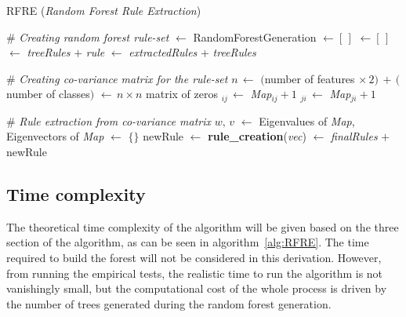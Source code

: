 \documentclass[10pt]{article}
\begin{document}
\begin{algorithm}[!ht]
\caption{RFRE (\textit{Random Forest Rule Extraction})}\label{alg:RFRE}
\begin{algorithmic}[1]
\State \# {\sl Creating random forest rule-set}
 $\gets$ RandomForestGeneration		
 $\gets [\, ]$
	  $\gets [\,]$
		 $\gets$ {\sl treeRules} $+$ {\sl rule} 
	\EndFor
	 $\gets$ {\sl extractedRules} + {\sl treeRules}
\EndFor

\State \# {\sl Creating co-variance matrix for the rule-set}
\State $n \, \gets$ $($number of features $\times \, 2) \, + \,($number of classes$)$ 
 $\gets \, n\times n$ matrix of zeros
		$_{ij} \, \gets$  {\sl Map}$_{ij} + 1$
		$_{ji} \, \gets$  {\sl Map}$_{ji} + 1$
	\EndIf
\EndFor

\State \# {\sl Rule extraction from co-variance matrix}
\State $w, \, v$ $\gets$ Eigenvalues of {\sl Map}, Eigenvectors of {\sl Map }
 $\gets$ $\{\}$
	\State newRule $\gets $ \textbf{rule\_creation}({\sl  vec})
	 $\gets$ {\sl finalRules} $+$ newRule
	\EndIf
\EndFor
\State {}
\end{algorithmic}
\end{algorithm}

\subsection{Time complexity}
The theoretical time complexity of the algorithm will be given based on the three section of the algorithm, as can be seen in algorithm~\ref{alg:RFRE}. The time required to build the forest will not be considered in this derivation. However, from running the empirical tests, the realistic time to run the algorithm is not vanishingly small, but the computational cost of the whole process is driven by the number of trees generated during the random forest generation.
\end{document}
